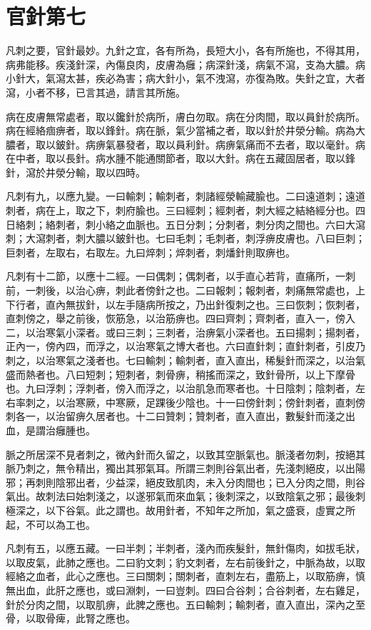 \section{官針第七}

凡刺之要，官針最妙。九針之宜，各有所為，長短大小，各有所施也，不得其用，病弗能移。疾淺針深，內傷良肉，皮膚為癰；病深針淺，病氣不瀉，支為大膿。病小針大，氣瀉太甚，疾必為害；病大針小，氣不洩瀉，亦復為敗。失針之宜，大者瀉，小者不移，已言其過，請言其所施。

病在皮膚無常處者，取以鑱針於病所，膚白勿取。病在分肉間，取以員針於病所。病在經絡痼痹者，取以鋒針。病在脈，氣少當補之者，取以針於井滎分輸。病為大膿者，取以鈹針。病痹氣暴發者，取以員利針。病痹氣痛而不去者，取以毫針。病在中者，取以長針。病水腫不能通關節者，取以大針。病在五藏固居者，取以鋒針，瀉於井滎分輸，取以四時。

凡刺有九，以應九變。一曰輸刺；輸刺者，刺諸經滎輸藏腧也。二曰遠道刺；遠道刺者，病在上，取之下，刺府腧也。三曰經刺；經刺者，刺大經之結絡經分也。四日絡刺；絡刺者，刺小絡之血脈也。五日分刺；分刺者，刺分肉之間也。六曰大瀉刺；大瀉刺者，刺大膿以鈹針也。七曰毛刺；毛刺者，刺浮痹皮膚也。八曰巨刺；巨刺者，左取右，右取左。九曰焠刺；焠刺者，刺燔針則取痹也。

凡刺有十二節，以應十二經。一曰偶刺；偶刺者，以手直心若背，直痛所，一刺前，一刺後，以治心痹，刺此者傍針之也。二曰報刺；報刺者，刺痛無常處也，上下行者，直內無拔針，以左手隨病所按之，乃出針復刺之也。三曰恢刺；恢刺者，直刺傍之，舉之前後，恢筋急，以治筋痹也。四曰齊刺；齊刺者，直入一，傍入二，以治寒氣小深者。或曰三刺；三刺者，治痹氣小深者也。五曰揚刺；揚刺者，正內一，傍內四，而浮之，以治寒氣之博大者也。六曰直針刺；直針刺者，引皮乃刺之，以治寒氣之淺者也。七曰輸刺；輸刺者，直入直出，稀髮針而深之，以治氣盛而熱者也。八曰短刺；短刺者，刺骨痹，稍搖而深之，致針骨所，以上下摩骨也。九曰浮刺；浮刺者，傍入而浮之，以治肌急而寒者也。十日陰刺；陰刺者，左右率刺之，以治寒厥，中寒厥，足踝後少陰也。十一曰傍針刺；傍針刺者，直刺傍刺各一，以治留痹久居者也。十二曰贊刺；贊刺者，直入直出，數髮針而淺之出血，是謂治癰腫也。

脈之所居深不見者刺之，微內針而久留之，以致其空脈氣也。脈淺者勿刺，按絕其脈乃刺之，無令精出，獨出其邪氣耳。所謂三刺則谷氣出者，先淺刺絕皮，以出陽邪；再刺則陰邪出者，少益深，絕皮致肌肉，未入分肉間也；已入分肉之間，則谷氣出。故刺法曰始刺淺之，以遂邪氣而來血氣；後刺深之，以致陰氣之邪；最後刺極深之，以下谷氣。此之謂也。故用針者，不知年之所加，氣之盛衰，虛實之所起，不可以為工也。

凡刺有五，以應五藏。一曰半刺；半刺者，淺內而疾髮針，無針傷肉，如拔毛狀，以取皮氣，此肺之應也。二曰豹文刺；豹文刺者，左右前後針之，中脈為故，以取經絡之血者，此心之應也。三曰關刺；關刺者，直刺左右，盡筋上，以取筋痹，慎無出血，此肝之應也，或曰淵刺，一曰豈刺。四曰合谷刺；合谷刺者，左右雞足，針於分肉之間，以取肌痹，此脾之應也。五曰輸刺；輸刺者，直入直出，深內之至骨，以取骨痺，此腎之應也。



